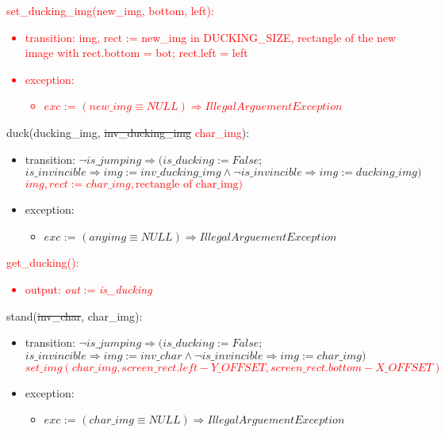 \documentclass[12pt]{article}
\begin{document}
\noindent \textcolor{red}{set\_ducking\_img(new\_img, bottom, left):
\begin{itemize}
    \item transition: img, rect :=  new\_img in DUCKING\_SIZE, rectangle of the new image with rect.bottom = bot; rect.left = left
\item exception: 
    \begin{itemize}[]
        \item $exc$ := $(new\_img \equiv NULL) \Rightarrow IllegalArguementException$
    \end{itemize}    
\end{itemize}}

\noindent duck(ducking\_img, \sout{inv\_ducking\_img} \textcolor{red}{char\_img}):
\begin{itemize}
\item transition: $\neg is\_jumping \Rightarrow (is\_ducking := False;$\\
\sout{$is\_invincible \Rightarrow img := inv\_ducking\_img \land \neg is\_invincible \Rightarrow img := ducking\_img)$}\\
\textcolor{red}{$img, rect := char\_img, \text{rectangle of char\_img})$}
\item exception:
    \begin{itemize}[]
        \item   $exc$ := $(any img \equiv NULL) \Rightarrow IllegalArguementException$
    \end{itemize}
\end{itemize}

\noindent \textcolor{red}{get\_ducking():
\begin{itemize}
\item output: \textit{out} := \textit{is\_ducking}
\end{itemize}}

\noindent stand(\sout{inv\_char}, char\_img):
\begin{itemize}
\item transition: $\neg is\_jumping \Rightarrow (is\_ducking := False;$\\
\sout{$is\_invincible \Rightarrow img := inv\_char \land \neg is\_invincible \Rightarrow img := char\_img)$}\\
\textcolor{red}{$set\_img(char\_img, screen\_rect.left - Y\_OFFSET, screen\_rect.bottom - X\_OFFSET)$}
\item exception:
    \begin{itemize}[]
        \item   $exc$ := $(char\_img \equiv NULL) \Rightarrow IllegalArguementException$
    \end{itemize}
\end{itemize}
\end{document}
